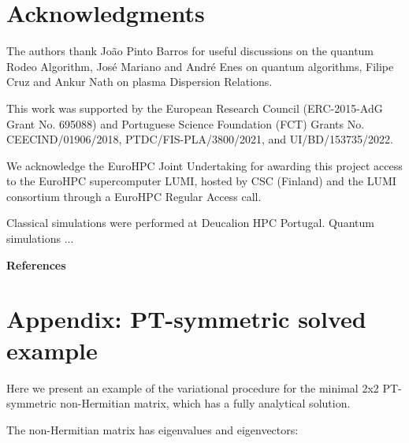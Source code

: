 \documentclass[12pt]{iopart}
\begin{document}
\section{Acknowledgments}\label{sc:acknowledgments}

% 
The authors thank João Pinto Barros for useful discussions on the quantum Rodeo Algorithm, José Mariano and André Enes on quantum algorithms, Filipe Cruz and Ankur Nath on plasma Dispersion Relations.


This work was supported by the European Research Council (ERC-2015-AdG Grant No. 695088) and Portuguese Science Foundation (FCT) Grants No. CEECIND/01906/2018, PTDC/FIS-PLA/3800/2021, and UI/BD/153735/2022.


We acknowledge the EuroHPC Joint Undertaking for awarding this project access to the EuroHPC supercomputer LUMI, hosted by CSC (Finland) and the LUMI consortium through a EuroHPC Regular Access call. 


Classical simulations were performed at Deucalion HPC Portugal.
%
Quantum simulations ...




\vspace{10pt}
\noindent \textbf{References}



\setcounter{equation}{0}
\renewcommand{\theequation}{A.\arabic{equation}}

\section*{Appendix: PT-symmetric solved example}\label{app:A}

Here we present an example of the variational procedure for the minimal 2x2 PT-symmetric non-Hermitian matrix, which has a fully analytical solution.

The non-Hermitian matrix has eigenvalues and eigenvectors:
\end{document}
